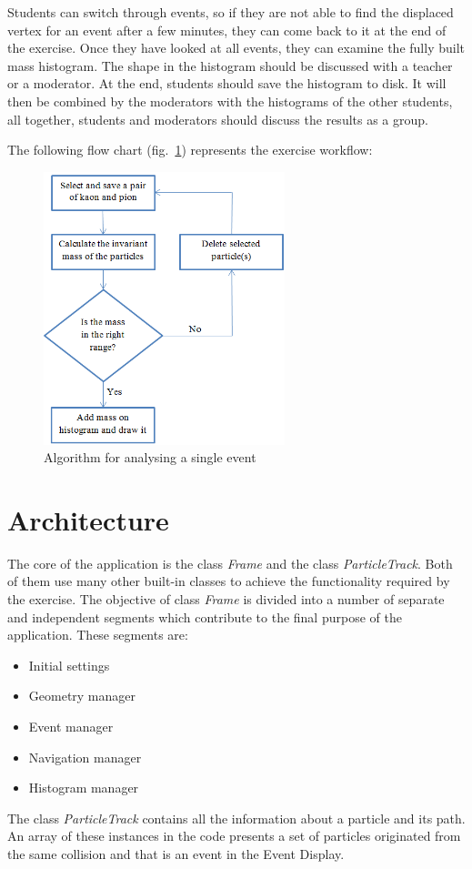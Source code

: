 \documentclass[3p,times,twocolumn]{elsarticle}
\begin{document}
Students can switch through events, so if they are not able to find the displaced vertex for an event after a few minutes, they can come back to it at the end of the exercise. Once they have looked at all events, they can examine the fully built mass histogram. The shape in the histogram should be discussed with a teacher or a moderator. At the end, students should save the histogram to disk. It will then be combined by the moderators with the histograms of the other students, all together, students and moderators should discuss the results as a group.

The following flow chart (fig.~\ref{o9}) represents the exercise workflow:
\begin{figure}[ht!]
	\centering
	\includegraphics[width=70mm]{29o1h1w.png}
	\caption{Algorithm for analysing a single event \label{o9}}
\end{figure}



\section{Architecture}
The core of the application is the class \textit{Frame} and the class \textit{ParticleTrack}. Both of them use many other built-in classes to achieve the functionality required by the exercise. The objective of class \textit{Frame} is divided into a number of separate and independent segments which contribute to the final purpose of the application. These segments are:
\begin{itemize}
\setlength{\itemsep}{0pt}
	\item Initial settings
	\item Geometry manager
	\item Event manager
	\item Navigation manager
	\item Histogram manager 
\end{itemize}
The class \textit{ParticleTrack} contains all the information about a particle and its path. An array of these instances in the code presents a set of particles originated from the same collision and that is an event in the Event Display. 
\end{document}
